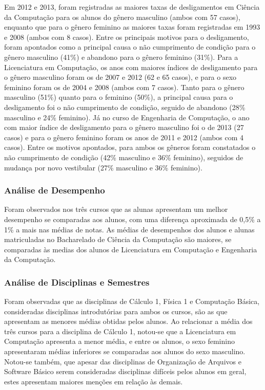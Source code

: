 Em 2012 e 2013, foram registradas as maiores taxas de desligamentos em Ciência da Computação para os alunos do gênero masculino (ambos com 57 casos), enquanto que para o gênero feminino as maiores taxas foram registradas em 1993 e 2008 (ambos com 8 casos). Entre os principais motivos para o desligamento, foram apontados como a principal causa o não cumprimento de condição para o gênero masculino (41\%) e abandono para o gênero feminino (31\%). Para a Licenciatura em Computação, os anos com maiores índices de desligamento para o gênero masculino foram os de 2007 e 2012 (62 e 65 casos), e para o sexo feminino foram os de 2004 e 2008 (ambos com 7 casos). Tanto para o gênero masculino (51\%) quanto para o feminino (50\%), a principal causa para o desligamento foi o não cumprimento de condição, seguido de abandono (28\% masculino e 24\% feminino). Já no curso de Engenharia de Computação, o ano com maior índice de desligamento para o gênero masculino foi o de 2013 (27 casos) e para o gênero feminino foram os anos de 2011 e 2012 (ambos com 4 casos). Entre os motivos apontados, para ambos os gêneros foram constatados o não cumprimento de condição (42\% masculino e 36\% feminino), seguidos de mudança por novo vestibular (27\% masculino e 36\% feminino).

\subsubsection{Análise de Desempenho}

Foram observados nos três cursos que as alunas apresentam um melhor desempenho se comparadas aos alunos, com uma diferença aproximada de 0,5\% a 1\% a mais nas médias de notas. As médias de desempenhos dos alunos e alunas matriculadas no Bacharelado de Ciência da Computação são maiores, se comparadas às medias dos alunos de Licenciatura em Computação e Engenharia da Computação. 

\subsubsection {Análise de Disciplinas e Semestres}

Foram observadas que as disciplinas de Cálculo 1, Física 1 e Computação Básica, consideradas disciplinas introdutórias para ambos os cursos, são as que apresentam as menores médias obtidas pelos alunos. Ao relacionar a média dos três cursos para a disciplina de Cálculo 1, notou-se que a Licenciatura em Computação apresenta a menor média, e entre os alunos, o sexo feminino apresentaram médias inferiores se comparadas aos alunos do sexo masculino. Notou-se também, que apesar das disciplinas de Organização de Arquivos e Software Básico serem consideradas disciplinas difíceis pelos alunos em geral, estes apresentam maiores menções em relação às demais.

